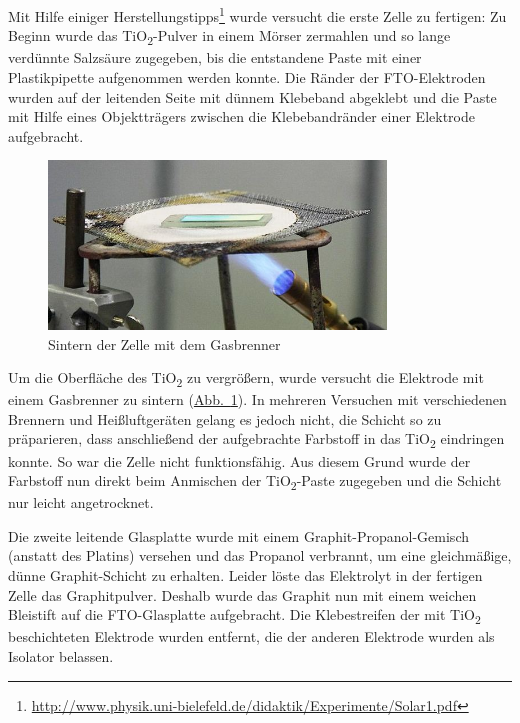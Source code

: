 \documentclass[11pt]{scrartcl}
\begin{document}
Mit Hilfe einiger Herstellungstipps\footnote{\url{http://www.physik.uni-bielefeld.de/didaktik/Experimente/Solar1.pdf}} wurde versucht die erste Zelle zu fertigen: Zu Beginn wurde das TiO\textsubscript{2}-Pulver in einem Mörser zermahlen und so lange verdünnte Salzsäure zugegeben, bis die entstandene Paste mit einer Plastikpipette aufgenommen werden konnte. Die Ränder der FTO-Elektroden wurden auf der leitenden Seite mit dünnem Klebeband abgeklebt und die Paste mit Hilfe eines Objektträgers zwischen die Klebebandränder einer Elektrode aufgebracht.

\begin{figure}[ht]
\begin{center}
\includegraphics[width=0.8\textwidth]{images/brennen.jpg}
\end{center}
\vspace{-1.5\baselineskip}
\caption{Sintern der Zelle mit dem Gasbrenner}
\label{fig:brennen}
\end{figure}

\newpage Um die Oberfläche des TiO\textsubscript{2} zu vergrößern, wurde versucht die Elektrode mit einem Gasbrenner zu sintern (\hyperref[fig:brennen]{Abb.~\ref{fig:brennen}}). In mehreren Versuchen mit verschiedenen Brennern und Heißluftgeräten gelang es jedoch nicht, die Schicht so zu präparieren, dass anschließend der aufgebrachte Farbstoff in das TiO\textsubscript{2} eindringen konnte. So war die Zelle nicht funktionsfähig. Aus diesem Grund wurde der Farbstoff nun direkt beim Anmischen der TiO\textsubscript{2}-Paste zugegeben und die Schicht nur leicht angetrocknet.

Die zweite leitende Glasplatte wurde mit einem Graphit-Propanol-Gemisch (anstatt des Platins) versehen und das Propanol verbrannt, um eine gleichmäßige, dünne Graphit-Schicht zu erhalten. Leider löste das Elektrolyt in der fertigen Zelle das Graphitpulver. Deshalb wurde das Graphit nun mit einem weichen Bleistift auf die FTO-Glasplatte aufgebracht. Die Klebestreifen der mit TiO\textsubscript{2} beschichteten Elektrode wurden entfernt, die der anderen Elektrode wurden als Isolator belassen.
\end{document}
